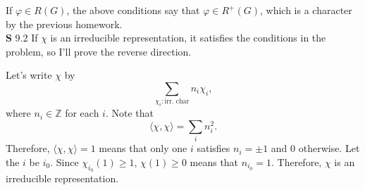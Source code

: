 \documentclass[a4paper, 12pt]{article}
\theoremstyle{Mydefinition}
\theoremstyle{Mytheorem}
\begin{document}
If $\varphi\in R(G)$, the above conditions say that $\varphi\in R^+(G)$, which is a character by the previous homework.\\

\noindent \textbf{S} 9.2
If $\chi$ is an irreducible representation, it satisfies the conditions in the problem, so I'll prove the reverse direction. 

Let's write $\chi$ by
\begin{equation}
    \sum_{\chi_i:\textrm{irr. char}} n_i\chi_i,
\end{equation}
where $n_i\in\mathbb{Z}$ for each $i$. Note that
\begin{equation}
    \langle \chi, \chi\rangle = \sum_{i} n_i^2.
\end{equation}
Therefore, $\langle\chi, \chi\rangle = 1$ means that only one $i$ satisfies $n_i=\pm 1$ and $0$ otherwise. Let the $i$ be $i_0$. Since $\chi_{i_0}(1)\geq 1$, $\chi(1)\geq 0$ means that $n_{i_0}= 1$. Therefore, $\chi$ is an irreducible representation.\\
\end{document}
